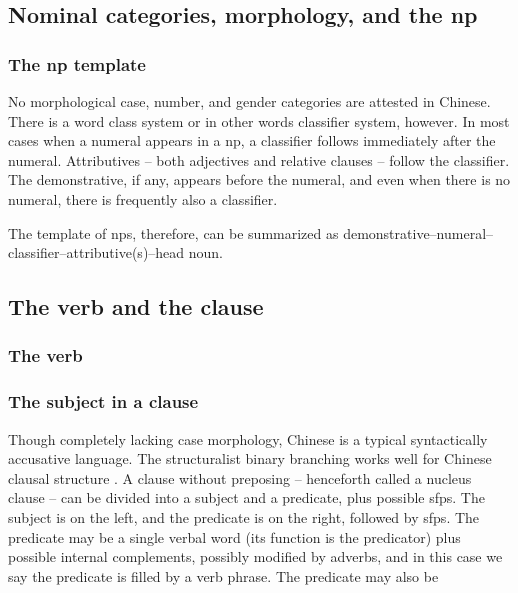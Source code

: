 \documentclass[UTF8, a4paper, oneside, scheme=plain]{ctexart}
\newcommand*{\citesec}[1]{\S~{#1}}
\begin{document}
\subsection{Nominal categories, morphology, and the \ac{np}}

\subsubsection{The \ac{np} template}

No morphological case, number, and gender categories are attested in Chinese.
There is a word class system or in other words classifier system, however.
In most cases when a numeral appears in a \ac{np},
a classifier follows immediately after the numeral.
Attributives -- both adjectives and relative clauses -- 
follow the classifier. %
The demonstrative, if any, appears before the numeral,
and even when there is no numeral,
there is frequently also a classifier.

The template of \ac{np}s, therefore, can be summarized as 
demonstrative--numeral--classifier--attributive(s)--head noun.

\subsection{The verb and the clause}

\subsubsection{The verb}



\subsubsection{The subject in a clause}

Though completely lacking case morphology,
Chinese is a typical syntactically accusative language.
The structuralist binary branching works well for Chinese clausal structure 
\citep[\citesec{133-136}]{zhudexigrammar}.
A clause without preposing -- henceforth called a nucleus clause --
can be divided into a subject and a predicate,
plus possible \ac{sfp}s.
The subject is on the left, and the predicate is on the right, followed by \ac{sfp}s.
The predicate may be a 
single verbal word (its function is the predicator) plus possible internal complements, 
possibly modified by adverbs,
and in this case we say the predicate is filled by a verb phrase.
The predicate may also be 
\end{document}
